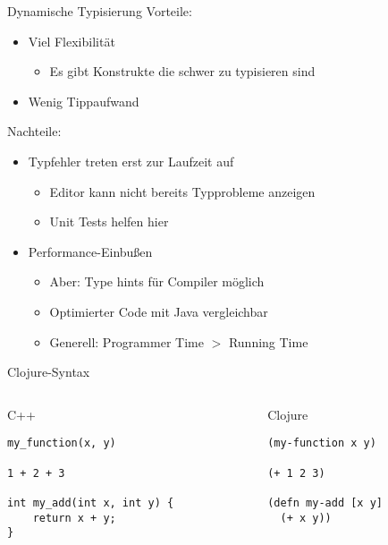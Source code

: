 \documentclass[presentation]{beamer}
\def\cpp{C++}
\begin{document}
\begin{frame}{Dynamische Typisierung}
  Vorteile:
  \begin{itemize}
  \item Viel Flexibilität
    \begin{itemize}
    \item Es gibt Konstrukte die schwer zu typisieren sind
    \end{itemize}
  \item Wenig Tippaufwand
  \end{itemize}

  Nachteile:
  \begin{itemize}
  \item Typfehler treten erst zur Laufzeit auf
    \begin{itemize}
    \item Editor kann nicht bereits Typprobleme anzeigen
    \item Unit Tests helfen hier
    \end{itemize}
  \item Performance-Einbußen
    \begin{itemize}
    \item Aber: Type hints für Compiler möglich
    \item Optimierter Code mit Java vergleichbar
    \item Generell: Programmer Time $>$ Running Time
    \end{itemize}
  \end{itemize}
\end{frame}

\begin{frame}[fragile]{Clojure-Syntax}
  \begin{columns}
    \begin{column}{0.5\textwidth}
      \begin{block}{\cpp}
\begin{verbatim}
my_function(x, y)

1 + 2 + 3

int my_add(int x, int y) {
    return x + y;
}
\end{verbatim}
      \end{block}
    \end{column}
    \begin{column}{0.5\textwidth}
      \begin{block}{Clojure}
\begin{verbatim}
(my-function x y)

(+ 1 2 3)

(defn my-add [x y]
  (+ x y))

\end{verbatim}
      \end{block}
    \end{column}
  \end{columns}
\end{frame}
\end{document}
